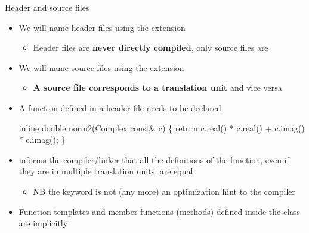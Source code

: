 \begin{frame}[fragile]{Header and source files \insertcontinuationtext}

  \begin{itemize}[<+->]
    \item We will name header files using the  extension
      \begin{itemize}[<.->]
      \item Header files are \textbf{never directly compiled}, only source files are
      \end{itemize}
    \item We will name source files using the  extension
      \begin{itemize}[<.->]
      \item \textbf{A source file corresponds to a translation unit} and vice versa
      \end{itemize}

    \item A function defined in a header file needs to be declared
    \textbf{}
    \begin{codeblock}
\alert{inline} double norm2(Complex const& c)
\{
  return c.real() * c.real() + c.imag() * c.imag();
\}\end{codeblock}

  \item {} informs the compiler/linker that all the
    definitions of the function, even if they are in multiple
    translation units, are equal
    \begin{itemize}
    \item NB the  keyword is not (any more) an
      optimization hint to the compiler
    \end{itemize}
  \item Function templates and member functions (methods) defined
    inside the class are implicitly 
  \end{itemize}

\end{frame}

